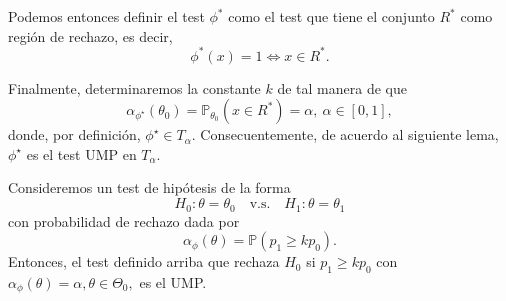 Podemos entonces definir el test $\phi^*$ como el test que tiene el conjunto $R^*$ como región de rechazo, es decir, 
\begin{equation}
	\phi^*(x) = 1 \Leftrightarrow x\in R^*.
\end{equation}

Finalmente, determinaremos la constante $k$ de tal manera de que 
\begin{equation}
	\alpha_{\phi^\star}(\theta_0) = \mathbb{P}_{\theta_0}(x\in R^*) = \alpha,\ \alpha\in[0,1], 
\end{equation}
donde, por definición, $\phi^\star\in T_\alpha$. Consecuentemente, de acuerdo al siguiente lema, $\phi^\star$ es el test UMP en $T_\alpha$.

\begin{lemma}
	Consideremos un test de hipótesis de la forma 
	\begin{equation}
		H_0:\theta =\theta_0\quad \text{v.s.}\quad H_1:\theta = \theta_1
	\end{equation}
	con probabilidad de rechazo dada por
	\begin{equation}
			\alpha_\phi(\theta) = \mathbb{P}(p_1\geq k p_0).
		\end{equation}
	Entonces, el test definido arriba que rechaza $H_0$ si $p_1\geq k p_0$ con $\alpha_\phi(\theta) = \alpha,\theta\in\Theta_0,$ es el UMP.
\end{lemma}

